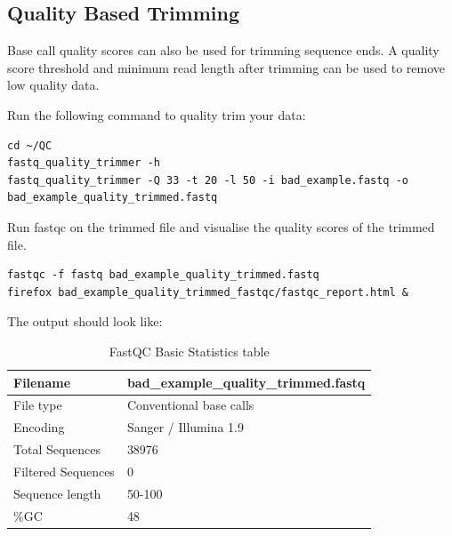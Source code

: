\subsection{Quality Based Trimming}
Base call quality scores can also be used for trimming sequence ends. A quality
score threshold and minimum read length after trimming can be used to remove low
quality data.

\begin{steps}
Run the following command to quality trim your data:
\begin{lstlisting}
cd ~/QC
fastq_quality_trimmer -h
fastq_quality_trimmer -Q 33 -t 20 -l 50 -i bad_example.fastq -o bad_example_quality_trimmed.fastq
\end{lstlisting}
\end{steps}

\begin{steps}
Run fastqc on the trimmed file and visualise the quality scores of the trimmed
file.

\begin{lstlisting}
fastqc -f fastq bad_example_quality_trimmed.fastq
firefox bad_example_quality_trimmed_fastqc/fastqc_report.html &
\end{lstlisting}

The output should look like:

\begin{table}[htbp]
  \centering
  \caption{FastQC Basic Statistics table}
    \begin{tabular}{ll}
    \toprule
    Filename & bad\_example\_quality\_trimmed.fastq \\
    \midrule
    File type & Conventional base calls \\
    Encoding & Sanger / Illumina 1.9 \\
    Total Sequences & 38976 \\
    Filtered Sequences & 0 \\
    Sequence length & 50-100 \\
    \%GC  & 48 \\
    \bottomrule
    \end{tabular}%
  \label{tab:badexamplequalitytrimmed}%
\end{table}%


\end{steps}
